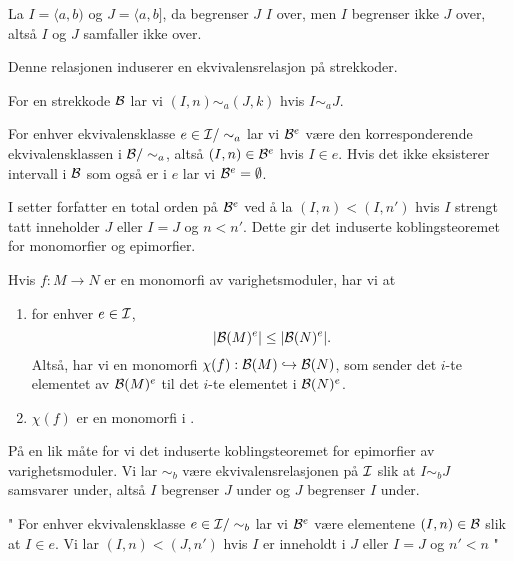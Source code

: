 \begin{bemerk}
  La $I = \langle a,b)$ og $J = \langle a,b]$, da
  begrenser $J$ $I$ over, men $I$ begrenser ikke $J$ over,
  altså $I$ og $J$ samfaller ikke over.
\end{bemerk}

Denne relasjonen induserer en ekvivalensrelasjon på
strekkoder.

\begin{definisjon}\label{def:EkRelBarc}
  For en strekkode $\mathcal{B}$ lar vi $(I,n)\sim_a (J,k)$ hvis
  $I\sim_a J$.
\end{definisjon}

For enhver ekvivalensklasse $e\in\mathcal{I}/\sim_a$ lar vi
$\mathcal{B}^e$ være den korresponderende ekvivalensklassen
i $\mathcal{B}/\sim_a$, altså $(I,n)\in\mathcal{B}^e$ hvis $I\in e$.
Hvis det ikke eksisterer intervall i $\mathcal{B}$ som også er
i $e$ lar vi $\mathcal{B}^e=\emptyset$.

I \citep[seksjon 3.2]{Bauer2020} setter forfatter en total orden
på $\mathcal{B}^e$ ved å la $(I,n) < (I,n')$ hvis $I$ strengt tatt
inneholder $J$ eller $I=J$ og $n<n'$. Dette gir det induserte
koblingsteoremet for monomorfier og epimorfier.

\begin{proposisjon}
Hvis $f:M\to N$ er en monomorfi av varighetsmoduler, har vi at
\begin{enumerate}
  \item for enhver $e\in\mathcal{I}$,
    \[|\mathcal{B}(M)^e|\leq|\mathcal{B}(N)^e|.\]
    Altså, har vi en monomorfi $\chi(f):\mathcal{B}(M)\hookrightarrow\mathcal{B}(N)$,
    som sender det $i$-te elementet av $\mathcal{B}(M)^e$ til det $i$-te
    elementet i $\mathcal{B}(N)^e$.
  \item $\chi(f)$ er en monomorfi i \Barc.
\end{enumerate}
\end{proposisjon}

På en lik måte for vi det induserte koblingsteoremet for
epimorfier av varighetsmoduler. Vi lar $\sim_b$ være
ekvivalensrelasjonen på $\mathcal{I}$ slik at $I\sim_b J$
samsvarer under, altså $I$ begrenser $J$ under og $J$
begrenser $I$ under. 


"
For enhver ekvivalensklasse
$e\in\mathcal{I}/\sim_b$ lar vi $\mathcal{B}^e$ være elementene
$(I,n)\in\mathcal{B}$ slik at $I\in e$. Vi lar $(I,n)<(J,n')$
hvis $I$ er inneholdt i $J$ eller $I=J$ og $n'<n$
"

